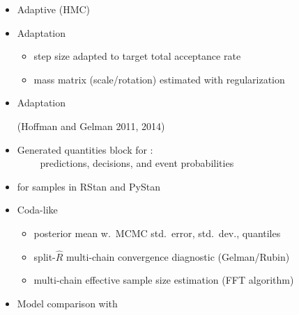 \documentclass[10pt]{report}
\begin{document}
%
\begin{itemize}
\item Adaptive  (HMC)
\item Adaptation 
  \vspace*{-4pt}
  \begin{itemize}\small
  \item step size adapted to target total acceptance rate
  \item mass matrix (scale/rotation) estimated with regularization
  \end{itemize}
\item Adaptation 
\vfill
\hfill
{\footnotesize (Hoffman and Gelman 2011, 2014)}
\end{itemize}


%
\begin{itemize}
\item Generated quantities block for :
  \\ {\small \mbox{ } \ \ \ predictions, decisions, and event probabilities}
\item {} for samples in RStan and PyStan
\item Coda-like 
  \vspace*{-4pt}
  \begin{itemize}\small
  \item posterior mean w.\ MCMC std.\ error, std.\ dev., quantiles
  \item split-$\hat{R}$ multi-chain convergence diagnostic (Gelman/Rubin)
  \item multi-chain effective sample size estimation (FFT algorithm)
  \end{itemize}
\item Model comparison with 
\end{itemize}
\end{document}
